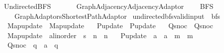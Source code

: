 %
\begin{isabellebody}%
%
%
\isadeliminvisible
%
\endisadeliminvisible
%
\isataginvisible
{}\isamarkupfalse%
\ Undirected{\isacharunderscore}{\kern0pt}BFS\isanewline
\ \ \isanewline
\ \ \ \ {\isachardoublequoteopen}{\isachardot}{\kern0pt}{\isachardot}{\kern0pt}{\isacharslash}{\kern0pt}Graph{\isacharslash}{\kern0pt}Adjacency{\isacharslash}{\kern0pt}Adjacency{\isacharunderscore}{\kern0pt}Adaptor{\isachardoublequoteclose}\isanewline
\ \ \ \ BFS\isanewline
\ \ \ \ {\isachardoublequoteopen}{\isachardot}{\kern0pt}{\isachardot}{\kern0pt}{\isacharslash}{\kern0pt}Graph{\isacharslash}{\kern0pt}Adaptors{\isacharslash}{\kern0pt}Shortest{\isacharunderscore}{\kern0pt}Path{\isacharunderscore}{\kern0pt}Adaptor{\isachardoublequoteclose}\isanewline
{}\isanewline
\isanewline
{}\isamarkupfalse%
\ undirected{\isacharunderscore}{\kern0pt}bfs{\isacharunderscore}{\kern0pt}valid{\isacharunderscore}{\kern0pt}input\ {\isacharequal}{\kern0pt}\ bfs\ \isanewline
\ \ Map{\isacharunderscore}{\kern0pt}update\ {\isacharequal}{\kern0pt}\ Map{\isacharunderscore}{\kern0pt}update\ \isanewline
\ \ P{\isacharunderscore}{\kern0pt}update\ {\isacharequal}{\kern0pt}\ P{\isacharunderscore}{\kern0pt}update\ \isanewline
\ \ Q{\isacharunderscore}{\kern0pt}snoc\ {\isacharequal}{\kern0pt}\ Q{\isacharunderscore}{\kern0pt}snoc\ \isanewline
\ \ Map{\isacharunderscore}{\kern0pt}update\ {\isacharcolon}{\kern0pt}{\isacharcolon}{\kern0pt}\ {\isachardoublequoteopen}{\isacharprime}{\kern0pt}a{\isacharcolon}{\kern0pt}{\isacharcolon}{\kern0pt}linorder\ {\isasymRightarrow}\ {\isacharprime}{\kern0pt}s\ {\isasymRightarrow}\ {\isacharprime}{\kern0pt}n\ {\isasymRightarrow}\ {\isacharprime}{\kern0pt}n{\isachardoublequoteclose}\ \isanewline
\ \ P{\isacharunderscore}{\kern0pt}update\ {\isacharcolon}{\kern0pt}{\isacharcolon}{\kern0pt}\ {\isachardoublequoteopen}{\isacharprime}{\kern0pt}a\ {\isasymRightarrow}\ {\isacharprime}{\kern0pt}a\ {\isasymRightarrow}\ {\isacharprime}{\kern0pt}m\ {\isasymRightarrow}\ {\isacharprime}{\kern0pt}m{\isachardoublequoteclose}\ \isanewline
\ \ Q{\isacharunderscore}{\kern0pt}snoc\ {\isacharcolon}{\kern0pt}{\isacharcolon}{\kern0pt}\ {\isachardoublequoteopen}{\isacharprime}{\kern0pt}q\ {\isasymRightarrow}\ {\isacharprime}{\kern0pt}a\ {\isasymRightarrow}\ {\isacharprime}{\kern0pt}q{\isachardoublequoteclose}\ {\isacharplus}{\kern0pt}\isanewline

\end{isabellebody}
